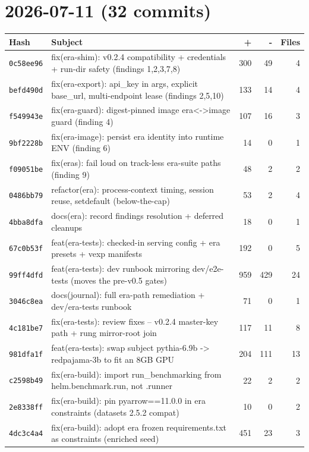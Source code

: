 \section*{2026-07-11 (32 commits)}
\begin{longtable}{@{}p{}p{}r r r@{}}
\toprule Hash & Subject & + & - & Files \\ \midrule\endhead
\texttt{0c58ee96} & fix(era-shim): v0.2.4 compatibility + credentials + run-dir safety (findings 1,2,3,7,8) & 300 & 49 & 4 \\
\texttt{befd490d} & fix(era-export): api\_key in args, explicit base\_url, multi-endpoint lease (findings 2,5,10) & 133 & 14 & 4 \\
\texttt{f549943e} & fix(era-guard): digest-pinned image era<->image guard (finding 4) & 107 & 16 & 3 \\
\texttt{9bf2228b} & fix(era-image): persist era identity into runtime ENV (finding 6) & 14 & 0 & 1 \\
\texttt{f09051be} & fix(eras): fail loud on track-less era-suite paths (finding 9) & 48 & 2 & 2 \\
\texttt{0486bb79} & refactor(era): process-context timing, session reuse, setdefault (below-the-cap) & 53 & 2 & 4 \\
\texttt{4bba8dfa} & docs(era): record findings resolution + deferred cleanups & 18 & 0 & 1 \\
\texttt{67c0b53f} & feat(era-tests): checked-in serving config + era presets + vexp manifests & 192 & 0 & 5 \\
\texttt{99ff4dfd} & feat(era-tests): dev runbook mirroring dev/e2e-tests (moves the pre-v0.5 gates) & 959 & 429 & 24 \\
\texttt{3046c8ea} & docs(journal): full era-path remediation + dev/era-tests runbook & 71 & 0 & 1 \\
\texttt{4c181be7} & fix(era-tests): review fixes -- v0.2.4 master-key path + rung mirror-root join & 117 & 11 & 8 \\
\texttt{981dfa1f} & feat(era-tests): swap subject pythia-6.9b -> redpajama-3b to fit an 8GB GPU & 204 & 111 & 13 \\
\texttt{c2598b49} & fix(era-build): import run\_benchmarking from helm.benchmark.run, not .runner & 22 & 2 & 2 \\
\texttt{2e8338ff} & fix(era-build): pin pyarrow==11.0.0 in era constraints (datasets 2.5.2 compat) & 10 & 0 & 2 \\
\texttt{4dc3c4a4} & fix(era-build): adopt era frozen requirements.txt as constraints (enriched seed) & 451 & 23 & 3 \\

\end{longtable}
